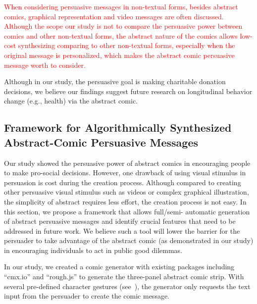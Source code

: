 \textcolor{red}{When considering persuasive messages in non-textual forms, besides abstract comics, graphical representation and video messages are often discussed. Although the scope our study is not to compare the persuasive power between comics and other non-textual forms, the abstract nature of the comics allows low-cost synthesizing comparing to other non-textual forms, especially when the original message is personalized, which makes the abstract comic persuasive message worth to consider.}

Although in our study, the persuasive goal is making charitable donation decisions, we believe our findings suggest future research on longitudinal behavior change (e.g., health) via the abstract comic. 

 \subsection{Framework for Algorithmically Synthesized Abstract-Comic Persuasive Messages}
 
Our study showed the persuasive power of abstract comics in encouraging people to make pro-social decisions. However, one drawback of using visual stimulus in persuasion is cost during the creation process. Although compared to creating other persuasive visual stimulus such as videos or complex graphical illustration, the simplicity of abstract requires less effort, the creation process is not easy. In this section, we propose a framework that allows full/semi- automatic generation of abstract persuasive messages and identify crucial features that need to be addressed in future work. We believe such a tool will lower the barrier for the persuader to take advantage of the abstract comic (as demonstrated in our study) in encouraging individuals to act in public good dilemmas.

In our study, we created a comic generator with existing packages including ``cmx.io'' \cite{cmx.io} and ``rough.js'' \cite{rough.js} to generate the three-panel abstract comic strip. With several pre-defined character gestures (see~), the generator only requests the text input from the persuader to create the comic message.  

